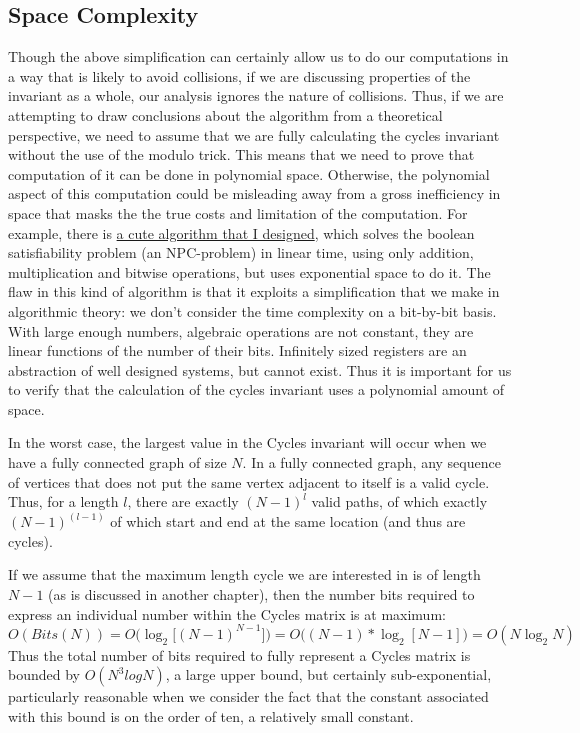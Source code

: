 \subsection{Space Complexity}
Though the above simplification can certainly allow us to do our computations in a way that is likely to avoid collisions, if we are discussing properties of the invariant as a whole, our analysis ignores the nature of collisions.
Thus, if we are attempting to draw conclusions about the algorithm from a theoretical perspective, we need to assume that we are fully calculating the cycles invariant without the use of the modulo trick.
This means that we need to prove that computation of it can be done in polynomial space.
Otherwise, the polynomial aspect of this computation could be misleading away from a gross inefficiency in space that masks the the true costs and limitation of the computation.
For example, there is \href{http://www.github.com/gbdubs/bytes}{a cute algorithm that I designed}, which solves the boolean satisfiability problem (an NPC-problem) in linear time, using only addition, multiplication and bitwise operations, but uses exponential space to do it. 
The flaw in this kind of algorithm is that it exploits a simplification that we make in algorithmic theory: we don't consider the time complexity on a bit-by-bit basis.
With large enough numbers, algebraic operations are not constant, they are linear functions of the number of their bits.
Infinitely sized registers are an abstraction of well designed systems, but cannot exist.
Thus it is important for us to verify that the calculation of the cycles invariant uses a polynomial amount of space.

In the worst case, the largest value in the Cycles invariant will occur when we have a fully connected graph of size $N$.
In a fully connected graph, any sequence of vertices that does not put the same vertex adjacent to itself is a valid cycle.
Thus, for a length $l$, there are exactly $(N-1)^l$ valid paths, of which exactly $(N-1)^{(l-1)}$ of which start and end at the same location (and thus are cycles).

If we assume that the maximum length cycle we are interested in is of length $N-1$ (as is discussed in another chapter), then the number bits required to express an individual number within the Cycles matrix is at maximum:
$$ O(Bits(N)) = O\Big( \log_2 \big[(N-1)^{N-1}\big] \Big) = O \big( (N - 1) * \log_2 [N-1] \big) = O(N \log_2 N)$$
Thus the total number of bits required to fully represent a Cycles matrix is bounded by $O(N^3logN)$, a large upper bound, but certainly sub-exponential, particularly reasonable when we consider the fact that the constant associated with this bound is on the order of ten, a relatively small constant.


